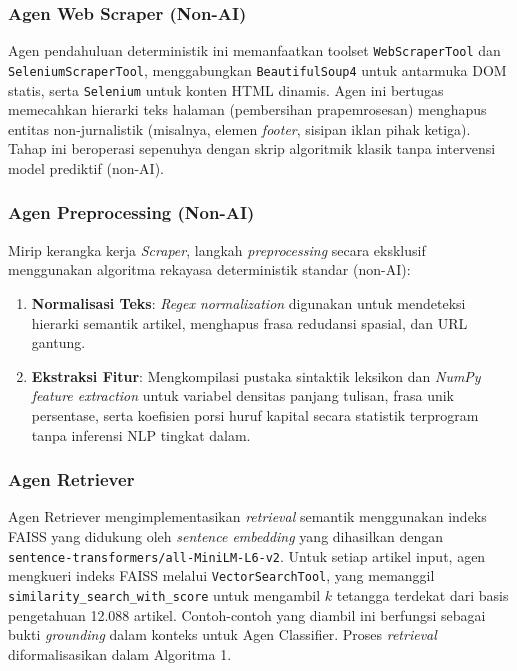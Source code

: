 \documentclass{ieeeaccess}
\begin{document}
\subsubsection{Agen Web Scraper (Non-AI)}
Agen pendahuluan deterministik ini memanfaatkan toolset \texttt{Web\allowbreak Scraper\allowbreak Tool} dan \texttt{Selenium\allowbreak Scraper\allowbreak Tool}, menggabungkan \texttt{Beautiful\allowbreak Soup4} untuk antarmuka DOM statis, serta \texttt{Selenium} untuk konten HTML dinamis. Agen ini bertugas memecahkan hierarki teks halaman (pembersihan prapemrosesan) menghapus entitas non-jurnalistik (misalnya, elemen \textit{footer}, sisipan iklan pihak ketiga). Tahap ini beroperasi sepenuhya dengan skrip algoritmik klasik tanpa intervensi model prediktif (non-AI).

\subsubsection{Agen Preprocessing (Non-AI)}
Mirip kerangka kerja \textit{Scraper}, langkah \textit{preprocessing} secara eksklusif menggunakan algoritma rekayasa deterministik standar (non-AI):
\begin{enumerate}
    \item \textbf{Normalisasi Teks}: \textit{Regex normalization} digunakan untuk mendeteksi hierarki semantik artikel, menghapus frasa redudansi spasial, dan URL gantung.
    \item \textbf{Ekstraksi Fitur}: Mengkompilasi pustaka sintaktik leksikon dan \textit{NumPy feature extraction} untuk variabel densitas panjang tulisan, frasa unik persentase, serta koefisien porsi huruf kapital secara statistik terprogram tanpa inferensi NLP tingkat dalam.
\end{enumerate}

\subsubsection{Agen Retriever}
Agen Retriever mengimplementasikan \textit{retrieval} semantik menggunakan indeks FAISS yang didukung oleh \textit{sentence embedding} yang dihasilkan dengan \texttt{sentence-transformers/all-MiniLM-L6-v2}. Untuk setiap artikel input, agen mengkueri indeks FAISS melalui \texttt{VectorSearch\allowbreak Tool}, yang memanggil \texttt{similarity\allowbreak\_search\allowbreak\_with\allowbreak\_score} untuk mengambil $k$ tetangga terdekat dari basis pengetahuan 12.088 artikel. Contoh-contoh yang diambil ini berfungsi sebagai bukti \textit{grounding} dalam konteks untuk Agen Classifier. Proses \textit{retrieval} diformalisasikan dalam Algoritma 1.
\end{document}
